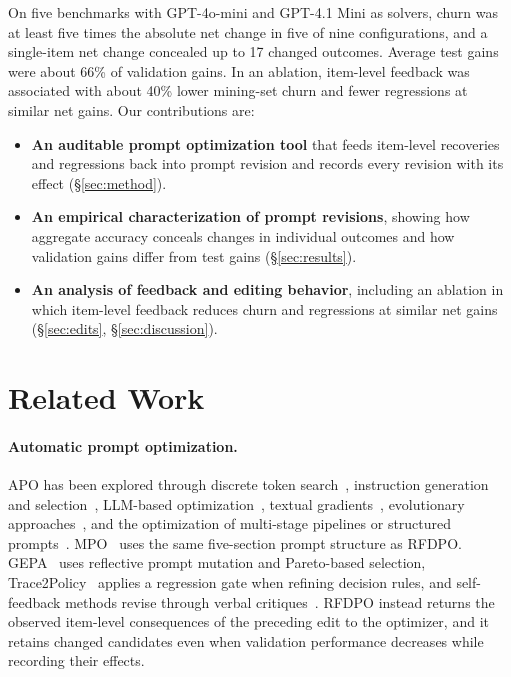 \documentclass[11pt]{article}
\begin{document}
On five benchmarks with GPT-4o-mini and GPT-4.1 Mini as solvers, churn was at least five times the absolute net change in five of nine configurations, and a single-item net change concealed up to 17 changed outcomes. Average test gains were about 66\% of validation gains. In an ablation, item-level feedback was associated with about 40\% lower mining-set churn and fewer regressions at similar net gains. Our contributions are:

\begin{itemize}
\setlength{\itemsep}{1pt}
\setlength{\parskip}{0pt}
\setlength{\topsep}{1pt}

\item \textbf{An auditable prompt optimization tool} that feeds item-level recoveries and regressions back into prompt revision and records every revision with its effect (\S\ref{sec:method}).

\item \textbf{An empirical characterization of prompt revisions}, showing how aggregate accuracy conceals changes in individual outcomes and how validation gains differ from test gains (\S\ref{sec:results}).

\item \textbf{An analysis of feedback and editing behavior}, including an ablation in which item-level feedback reduces churn and regressions at similar net gains (\S\ref{sec:edits}, \S\ref{sec:discussion}).

\end{itemize}

\section{Related Work}
\label{sec:related}

\paragraph{Automatic prompt optimization.}
APO has been explored through discrete token search~\citep{shin2020autoprompt}, instruction generation and selection~\citep{zhou2023ape}, LLM-based optimization~\citep{yang2024opro}, textual gradients~\citep{pryzant2023protegi,yuksekgonul2025textgrad}, evolutionary approaches~\citep{guo2024evoprompt,fernando2024promptbreeder}, and the optimization of multi-stage pipelines or structured prompts~\citep{opsahlong2024miprov2,schnabel2024sammo,khattab2024dspy}. MPO~\citep{sharma2026mpo} uses the same five-section prompt structure as RFDPO. GEPA~\citep{agrawal2026gepa} uses reflective prompt mutation and Pareto-based selection, Trace2Policy~\citep{zha2026trace2policy} applies a regression gate when refining decision rules, and self-feedback methods revise through verbal critiques~\citep{madaan2023selfrefine,shinn2023reflexion}. RFDPO instead returns the observed item-level consequences of the preceding edit to the optimizer, and it retains changed candidates even when validation performance decreases while recording their effects.
\end{document}
